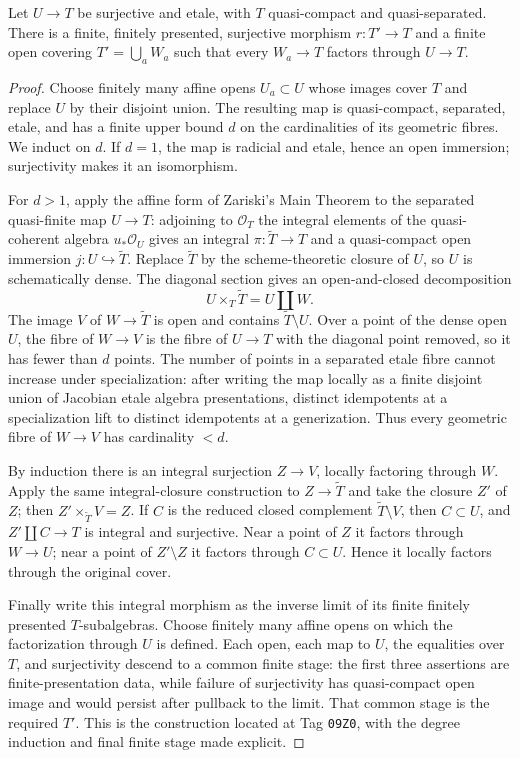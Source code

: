 \begin{lemma}
\label{lemma:weil-pbc-finite-refinement-etale-cover}
\uses{}
Let $U\to T$ be surjective and etale, with $T$ quasi-compact and
quasi-separated.  There is a finite, finitely presented, surjective morphism
$r:T'\to T$ and a finite open covering $T'=\bigcup_aW_a$ such that every
$W_a\to T$ factors through $U\to T$.
\end{lemma}
\begin{proof}
\uses{} 
Choose finitely many affine opens $U_a\subset U$ whose images cover $T$ and
replace $U$ by their disjoint union.  The resulting map is quasi-compact,
separated, etale, and has a finite upper bound $d$ on the cardinalities of
its geometric fibres.  We induct on $d$.  If $d=1$, the map is radicial and
etale, hence an open immersion; surjectivity makes it an isomorphism.

For $d>1$, apply the affine form of Zariski's Main Theorem to the separated
quasi-finite map $U\to T$: adjoining to $\mathcal O_T$ the integral elements
of the quasi-coherent algebra $u_*\mathcal O_U$ gives an integral
$\pi:\widetilde T\to T$ and a quasi-compact open immersion
$j:U\hookrightarrow\widetilde T$.  Replace $\widetilde T$ by the
scheme-theoretic closure of $U$, so $U$ is schematically dense.  The diagonal
section gives an open-and-closed decomposition
\[
 U\times_T\widetilde T=U\amalg W.
\]
The image $V$ of $W\to\widetilde T$ is open and contains
$\widetilde T\setminus U$.  Over a point of the dense open $U$, the fibre of
$W\to V$ is the fibre of $U\to T$ with the diagonal point removed, so it has
fewer than $d$ points.  The number of points in a separated etale fibre
    cannot increase under specialization: after writing the map locally as a
    finite disjoint union of Jacobian etale algebra presentations, distinct idempotents at a
specialization lift to distinct idempotents at a generization.  Thus every
geometric fibre of $W\to V$ has cardinality $<d$.

By induction there is an integral surjection $Z\to V$, locally factoring
through $W$.  Apply the same integral-closure construction to
$Z\to\widetilde T$ and take the closure $Z'$ of $Z$; then
$Z'\times_{\widetilde T}V=Z$.  If $C$ is the reduced closed complement
$\widetilde T\setminus V$, then $C\subset U$, and
$Z'\amalg C\to T$ is integral and surjective.  Near a point of $Z$ it
factors through $W\to U$; near a point of $Z'\setminus Z$ it factors through
$C\subset U$.  Hence it locally factors through the original cover.

Finally write this integral morphism as the inverse limit of its finite
finitely presented $T$-subalgebras.  Choose finitely many affine opens on
which the factorization through $U$ is defined.  Each open, each map to $U$,
the equalities over $T$, and surjectivity descend to a common finite stage:
the first three assertions are finite-presentation data, while failure of
surjectivity has quasi-compact open image and would persist after pullback to
the limit.  That common stage is the required $T'$.  This is the construction
located at Tag \texttt{09Z0}, with the degree induction and final finite stage
made explicit.
\end{proof}

